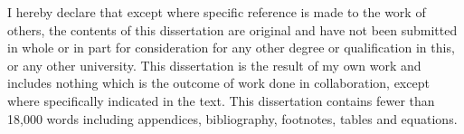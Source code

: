 
\begin{declaration}

I hereby declare that except where specific reference is made to the work of others, the contents of this dissertation are original and have not been submitted in whole or in part for consideration for any other degree or qualification in this, or any other university. This dissertation is the result of my own work and includes nothing which is the outcome of work done in collaboration, except where specifically indicated in the text. This dissertation contains fewer than 18,000 words including appendices, bibliography, footnotes, tables and equations.


\end{declaration}

